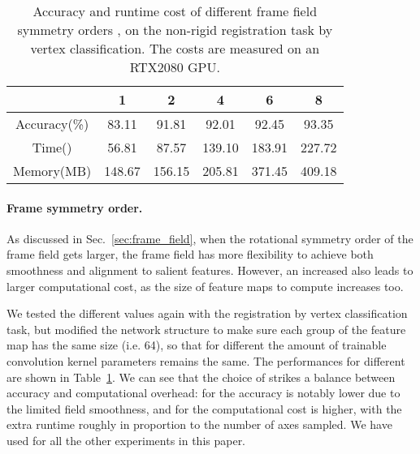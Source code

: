 \documentclass[10pt,twocolumn,letterpaper]{article}
\begin{document}
\begin{table}
	\caption{Accuracy and runtime cost of different frame field symmetry orders , on the non-rigid registration task by vertex classification. The costs are measured on an RTX2080 GPU.}
	\label{tab:comparing_different_symorders}
	\centering\footnotesize
	\begin{tabular}{|c|c|c|c|c|c|}
		\hline
		  & 1 & 2 & 4 & 6 & 8 \\ \hline
		Accuracy(\%) & 83.11 &91.81 &92.01 &92.45 &93.35  \\ \hline
		Time() & 56.81 &87.57 &139.10 &183.91 & 227.72 \\ \hline
		Memory(MB) & 148.67 & 156.15 & 205.81 & 371.45 & 409.18 \\ \hline
	\end{tabular}
	\vspace{-1mm}
\end{table}

\vspace{-3mm}
\paragraph{Frame symmetry order.}
As discussed in Sec.~\ref{sec:frame_field}, when the rotational symmetry order  of the frame field gets larger, the frame field has more flexibility to achieve both smoothness and alignment to salient features. 
However, an increased  also leads to larger computational cost, as the size of feature maps to compute increases too. 

We tested the different  values again with the registration by vertex classification task, but modified the network structure to make sure each group of the feature map has the same size (i.e. 64), so that for different  the amount of trainable convolution kernel parameters remains the same.
The performances for different  are shown in Table~\ref{tab:comparing_different_symorders}.
We can see that the choice of  strikes a balance between accuracy and computational overhead:
for  the accuracy is notably lower due to the limited field smoothness, and for  the computational cost is higher, with the extra runtime roughly in proportion to the number of axes sampled. We have used  for all the other experiments in this paper.


\vspace{-3mm}
\end{document}
